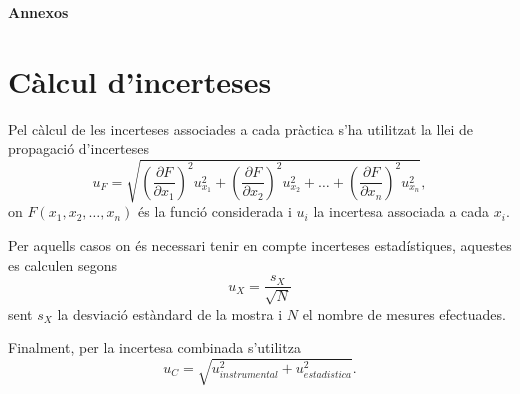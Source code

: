 \documentclass[a4paper,10.5pt]{report}
\begin{document}
\begin{appendices}

\textbf{\Huge{Annexos}}
\renewcommand{\thesection}{\Alph{section}} %
\renewcommand{\theequation}{\thesection.\arabic{equation}} %
\setcounter{equation}{0} %

\section{Càlcul d'incerteses}
\label{an:a3}
Pel càlcul de les incerteses associades a cada pràctica s'ha utilitzat la llei de propagació d'incerteses
\begin{equation}
	u_F = \sqrt{ \left( \frac{\partial F}{\partial x_1} \right)^2 u_{x_1}^2 + \left( \frac{\partial F}{\partial x_2} \right)^2 u_{x_2}^2 + \dots + \left( \frac{\partial F}{\partial x_n} \right)^2 u_{x_n}^2 },
\end{equation}
on $F(x_1,x_2,\ldots,x_n)$ és la funció considerada i $u_i$ la incertesa associada a cada $x_i$.

Per aquells casos on és necessari tenir en compte incerteses estadístiques, aquestes es calculen segons
\begin{equation}
	u_X=\frac{s_X}{\sqrt{N}}
\end{equation}
sent $s_X$ la desviació estàndard de la mostra i $N$ el nombre de mesures efectuades.

Finalment, per la incertesa combinada s'utilitza
\begin{equation}
	u_C=\sqrt{u_{instrumental}^2+u_{estadistica}^2}.
\end{equation}


\end{appendices}
\end{document}
